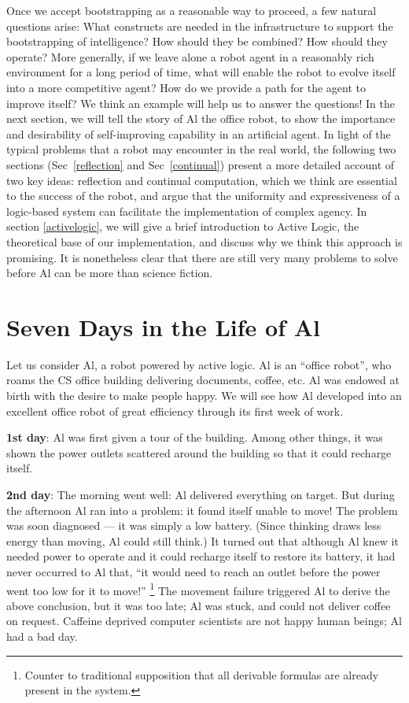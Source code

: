 \documentclass{llncs}
\begin{document}
Once we accept bootstrapping as a reasonable way to proceed, a few natural
questions arise: What constructs are needed in the infrastructure to
support the bootstrapping of intelligence?  How should they be combined?
How should they operate?  More generally, if we leave alone a robot agent
in a reasonably rich environment for a long period of time, what will
enable the robot to evolve itself into a more competitive agent?  How do we
provide a path for the agent to improve itself?  We think an example will
help us to answer the questions!  In the next section, we will tell the
story of Al the office robot, to show the importance and desirability of
self-improving capability in an artificial agent.  In light of the typical
problems that a robot may encounter in the real world, the following two
sections (Sec~\ref{reflection} and Sec~\ref{continual}) present a more
detailed account of two key ideas: reflection and continual computation,
which we think are essential to the success of the robot, and argue that
the uniformity and expressiveness of a logic-based system can facilitate
the implementation of complex agency.  In section \ref{activelogic}, we
will give a brief introduction to Active Logic, the theoretical base of our
implementation, and discuss why we think this approach is promising.  It is
nonetheless clear that there are still very many problems to solve before
Al can be more than science fiction.


\section{Seven Days in the Life of Al}

Let us consider Al, a robot powered by active logic.  Al is an {}``office
robot'', who roams the CS office building delivering documents, coffee,
etc.  Al was endowed at birth with the desire to make people happy.  We
will see how Al developed into an excellent office robot of great
efficiency through its first week of work.

\noindent \textbf{1st day}: Al was first given a tour of the building.
Among other things, it was shown the power outlets scattered around the
building so that it could recharge itself.

\noindent \textbf{2nd day}: The morning went well: Al delivered everything
on target.  But during the afternoon Al ran into a problem: it found itself
unable to move! The problem was soon diagnosed --- it was simply a low
battery.  (Since thinking draws less energy than moving, Al could still
think.) It turned out that although Al knew it needed power to operate and
it could recharge itself to restore its battery, it had never occurred to
Al that, {}``it would need to reach an outlet
before the power went too low for it to move!'' %
\footnote{Counter to traditional supposition that all derivable formulas
  are already present in the system.  } The movement failure triggered Al
to derive the above conclusion, but it was too late; Al was stuck, and
could not deliver coffee on request.  Caffeine deprived computer scientists
are not happy human beings; Al had a bad day.
\end{document}
